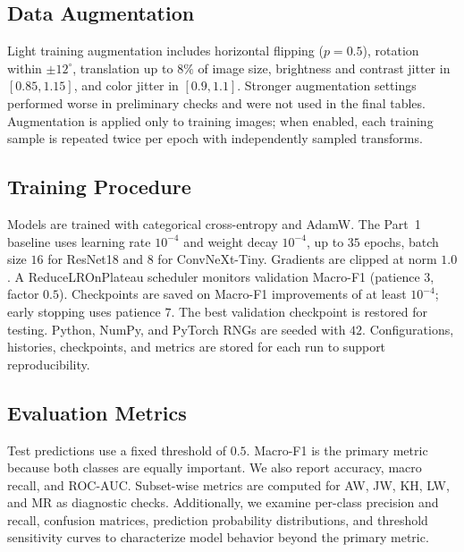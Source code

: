 \documentclass[sigconf]{acmart}
\begin{document}
\subsection{Data Augmentation}
\label{subsec:data-augmentation}

Light training augmentation includes horizontal flipping ($p=0.5$), rotation
within $\pm12^{\circ}$, translation up to $8\%$ of image size, brightness and
contrast jitter in $[0.85,1.15]$, and color jitter in $[0.9,1.1]$. Stronger
augmentation settings performed worse in preliminary checks and were not used
in the final tables. Augmentation is applied only to training images; when
enabled, each training sample is repeated twice per epoch with independently
sampled transforms.

\subsection{Training Procedure}
\label{subsec:training-procedure}

Models are trained with categorical cross-entropy and AdamW. The Part~1
baseline uses learning rate $10^{-4}$ and weight decay $10^{-4}$, up to $35$
epochs, batch size $16$ for ResNet18 and $8$ for ConvNeXt-Tiny. Gradients are
clipped at norm $1.0$. A ReduceLROnPlateau scheduler monitors validation
Macro-F1 (patience $3$, factor $0.5$). Checkpoints are saved on Macro-F1
improvements of at least $10^{-4}$; early stopping uses patience $7$. The best
validation checkpoint is restored for testing. Python, NumPy, and PyTorch RNGs
are seeded with $42$. Configurations, histories, checkpoints, and metrics are
stored for each run to support reproducibility.

\subsection{Evaluation Metrics}
\label{subsec:evaluation-metrics}

Test predictions use a fixed threshold of $0.5$. Macro-F1 is the primary
metric because both classes are equally important. We also report accuracy,
macro recall, and ROC-AUC. Subset-wise metrics are computed for AW, JW, KH,
LW, and MR as diagnostic checks. Additionally, we examine per-class precision
and recall, confusion matrices, prediction probability distributions, and
threshold sensitivity curves to characterize model behavior beyond the primary
metric.

\end{document}
